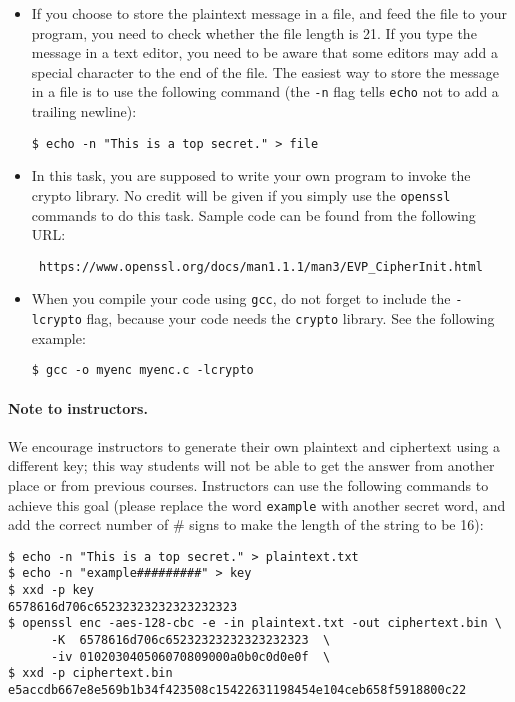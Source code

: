 \begin{itemize}
\item If you choose to store the plaintext message in
a file, and feed the file to your program, you need to check
whether the file length is 21. If you type the message in a text editor,
you need to be aware that some editors may add a special
character to the end of the file. The easiest way to store the message
in a file is to use the following
command (the \texttt{-n} flag
tells \texttt{echo} not to  add a trailing newline):


\begin{lstlisting}
$ echo -n "This is a top secret." > file
\end{lstlisting}

\item In this task, you are supposed to write your own program
to invoke the crypto library. No credit will be given
if you simply use the {\tt openssl} commands to do this task.
Sample code can be found from the following URL:
\begin{lstlisting}
 https://www.openssl.org/docs/man1.1.1/man3/EVP_CipherInit.html
\end{lstlisting}


\item When you compile your code using  \texttt{gcc},
do not forget to include the \texttt{-lcrypto} flag, because your code
needs the \texttt{crypto} library. See the following example:

\begin{lstlisting}
$ gcc -o myenc myenc.c -lcrypto
\end{lstlisting}

\end{itemize}

\paragraph{Note to instructors.}
We encourage instructors to generate their own plaintext and ciphertext using
a different key; this way students will not be able to get the answer from
another place or from previous courses. Instructors can use the
following commands to achieve this goal (please replace the word \texttt{example}
with another secret word, and add the correct number of \# signs to make
the length of the string to be 16):

\begin{lstlisting}
$ echo -n "This is a top secret." > plaintext.txt
$ echo -n "example#########" > key
$ xxd -p key
6578616d706c65232323232323232323
$ openssl enc -aes-128-cbc -e -in plaintext.txt -out ciphertext.bin \
      -K  6578616d706c65232323232323232323  \
      -iv 010203040506070809000a0b0c0d0e0f  \
$ xxd -p ciphertext.bin
e5accdb667e8e569b1b34f423508c15422631198454e104ceb658f5918800c22
\end{lstlisting}



